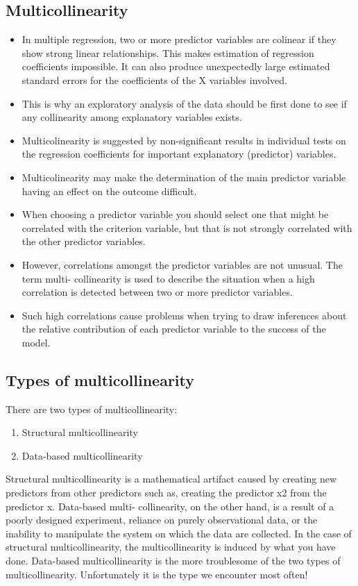 \documentclass[a4paper,12pt]{article}
\begin{document}
\subsection{Multicollinearity}
\begin{itemize}
\item In multiple regression, two or more predictor variables are colinear if they show strong
linear relationships. This makes estimation of regression coefficients impossible. It can
also produce unexpectedly large estimated standard errors for the coefficients of the X
variables involved.
\item This is why an exploratory analysis of the data should be first done to see if any collinearity
among explanatory variables exists.
\item Multicolinearity is suggested by non-significant results in individual tests on the regression
coefficients for important explanatory (predictor) variables.
\item Multicolinearity may make the determination of the main predictor variable having an
effect on the outcome difficult.
\item When choosing a predictor variable you should select one that might be correlated with
the criterion variable, but that is not strongly correlated with the other predictor variables.
\item However, correlations amongst the predictor variables are not unusual. The term multi-
collinearity is used to describe the situation when a high correlation is detected between
two or more predictor variables.
\item Such high correlations cause problems when trying to draw inferences about the relative
contribution of each predictor variable to the success of the model.
\end{itemize}
\subsection{Types of multicollinearity}
There are two types of multicollinearity:
\begin{enumerate}
\item Structural multicollinearity
\item Data-based multicollinearity
\end{enumerate}
Structural multicollinearity is a mathematical artifact caused by creating new predictors from
other predictors such as, creating the predictor x2 from the predictor x. Data-based multi-
collinearity, on the other hand, is a result of a poorly designed experiment, reliance on purely
observational data, or the inability to manipulate the system on which the data are collected.
In the case of structural multicollinearity, the multicollinearity is induced by what you have
done. Data-based multicollinearity is the more troublesome of the two types of multicollinearity.
Unfortunately it is the type we encounter most often!
\end{document}
